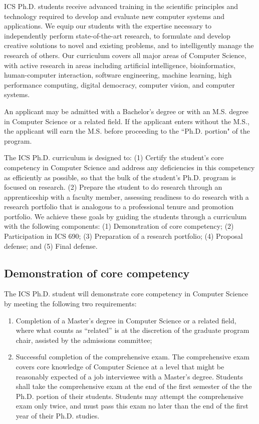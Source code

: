 \documentclass[12pt]{article}
\begin{document}
ICS Ph.D. students receive advanced training in the scientific principles and
technology required to develop and evaluate new computer systems and
applications. We equip our students with the expertise necessary to
independently perform state-of-the-art research, to formulate and develop
creative solutions to novel and existing problems, and to intelligently
manage the research of others. Our curriculum covers all major areas of
Computer Science, with active research in areas including artificial
intelligence, bioinformatics, human-computer interaction, software
engineering, machine learning, high performance computing, digital
democracy, computer vision, and computer systems.

An applicant may be admitted with a Bachelor's degree or with an
M.S. degree in Computer Science or a related field. If the applicant enters
without the M.S., the applicant will earn the M.S. before proceeding to the
``Ph.D. portion" of the program.

The ICS Ph.D. curriculum is designed to: (1) Certify the student's core
competency in Computer Science and address any deficiencies in this
competency as efficiently as possible, so that the bulk of the student's
Ph.D. program is focused on research. (2) Prepare the student to do
research through an apprenticeship with a faculty member, assessing
readiness to do research with a research portfolio that is analogous to a
professional tenure and promotion portfolio.  We achieve these goals by
guiding the students through a curriculum with the following components:
(1) Demonstration of core competency; (2) Participation in ICS 690; (3)
Preparation of a research portfolio; (4) Proposal defense; and (5) Final
defense.

\subsection{Demonstration of core competency}

The ICS Ph.D. student will demonstrate core competency in Computer Science
by meeting the following two requirements:

\begin{enumerate}
\item Completion of a Master's degree in Computer Science or a related
  field, where what counts as ``related'' is at the discretion of the
  graduate program chair, assisted by the admissions committee;
\item Successful completion of the comprehensive exam.  The comprehensive exam
  covers core knowledge of Computer Science at a level that might be
  reasonably expected of a job interviewee with a Master's degree.
  Students shall take the comprehensive exam at the end of the first semester
  of the the Ph.D. portion of their students.  Students may attempt the
  comprehensive exam only twice, and must pass this exam no later than the end
  of the first year of their Ph.D. studies.  
\end{enumerate}
\end{document}
